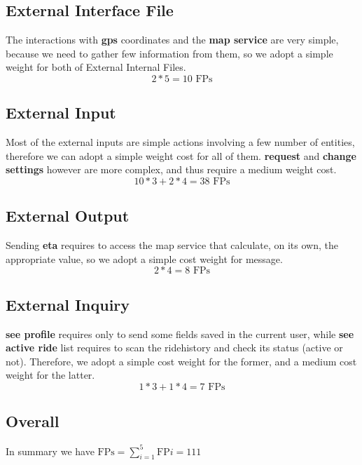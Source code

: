   \subsection{External Interface File}
  The interactions with \textbf{gps} coordinates and the \textbf{map service} are very simple, 
  because we need to gather few information from them, so we adopt a simple weight for
  both of External Internal Files.
  \begin{equation}
   2*5 = 10 \text{ FPs}
  \end{equation}
  
  \subsection{External Input}
  Most of the external inputs are simple actions involving a few number of entities,
  therefore we can adopt a simple weight cost for all of them.
  \textbf{request} and \textbf{change settings} however are more complex, and thus require a medium weight cost.
  \begin{equation}
    10*3 + 2*4= 38 \text{ FPs}
  \end{equation}
  
  \subsection{External Output}
  Sending \textbf{eta} requires to access the map service that calculate, on its own,
  the appropriate value, so we adopt a simple cost weight for message.
  \begin{equation}
    2*4 = 8 \text{ FPs}
  \end{equation}
  
  \subsection{External Inquiry}
  \textbf{see profile} requires only to send some fields saved in the current user,
  while \textbf{see active ride} list requires to scan the ridehistory and check its status (active or not).
  Therefore, we adopt a simple cost weight for the former, and a medium cost weight for the latter.
  \begin{equation}
    1*3 + 1*4 = 7 \text{ FPs}
  \end{equation}
  
  \subsection{Overall}
  In summary we have $\text{FPs} = \sum_{i=1}^{5} \text{FP}i = 111 $
 